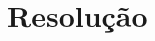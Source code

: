 \documentclass[12pt]{article}
\begin{document}
    

    \section*{Resolução}
    
    
    
\end{document}
